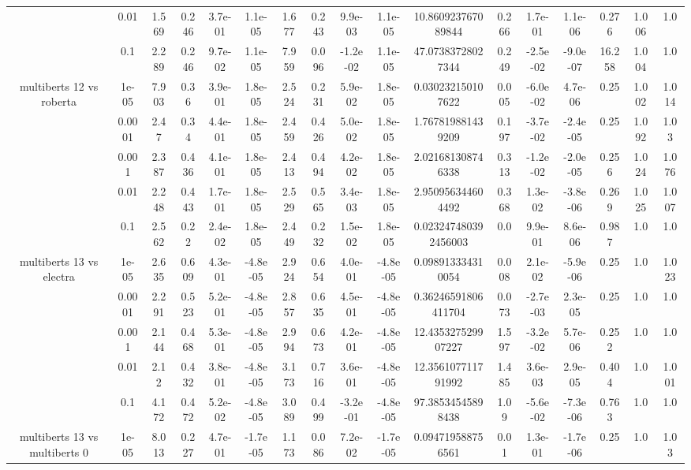 \begin{tabular}{|c|c|c|c|c|c|c|c|c|c|c|c|c|c|c|c|c|}
 & 0.01 & 1.569 & 0.246 & 3.7e-01 & 1.1e-05 & 1.677 & 0.243 & 9.9e-03 & 1.1e-05 & 10.860923767089844 & 0.266 & 1.7e-01 & 1.1e-06 & 0.276 & 1.006 & 1.0 \\
 & 0.1 & 2.289 & 0.246 & 9.7e-02 & 1.1e-05 & 7.959 & 0.096 & -1.2e-02 & 1.1e-05 & 47.07383728027344 & 0.249 & -2.5e-02 & -9.0e-07 & 16.258 & 1.004 & 1.0 \\
\hline
\multirow{5}{*}{multiberts 12 vs roberta } & 1e-05 & 7.903 & 0.36 & 3.9e-01 & 1.8e-05 & 2.524 & 0.231 & 5.9e-02 & 1.8e-05 & 0.030232150107622 & 0.005 & -6.0e-02 & 4.7e-06 & 0.25 & 1.002 & 1.014 \\
 & 0.0001 & 2.47 & 0.34 & 4.4e-01 & 1.8e-05 & 2.459 & 0.426 & 5.0e-02 & 1.8e-05 & 1.767819881439209 & 0.197 & -3.7e-02 & -2.4e-05 & 0.25 & 1.092 & 1.03 \\
 & 0.001 & 2.387 & 0.436 & 4.1e-01 & 1.8e-05 & 2.413 & 0.494 & 4.2e-02 & 1.8e-05 & 2.021681308746338 & 0.313 & -1.2e-02 & -2.0e-05 & 0.256 & 1.024 & 1.076 \\
 & 0.01 & 2.248 & 0.443 & 1.7e-01 & 1.8e-05 & 2.529 & 0.565 & 3.4e-03 & 1.8e-05 & 2.950956344604492 & 0.368 & 1.3e-02 & -3.8e-06 & 0.269 & 1.025 & 1.007 \\
 & 0.1 & 2.562 & 0.22 & 2.4e-02 & 1.8e-05 & 2.449 & 0.232 & 1.5e-02 & 1.8e-05 & 0.023247480392456003 & 0.0 & 9.9e-01 & 8.6e-06 & 0.987 & 1.0 & 1.0 \\
\hline
\multirow{5}{*}{multiberts 13 vs electra } & 1e-05 & 2.635 & 0.609 & 4.3e-01 & -4.8e-05 & 2.924 & 0.654 & 4.0e-01 & -4.8e-05 & 0.098913334310054 & 0.008 & 2.1e-02 & -5.9e-06 & 0.25 & 1.0 & 1.023 \\
 & 0.0001 & 2.291 & 0.523 & 5.2e-01 & -4.8e-05 & 2.857 & 0.635 & 4.5e-01 & -4.8e-05 & 0.36246591806411704 & 0.073 & -2.7e-03 & 2.3e-05 & 0.25 & 1.0 & 1.0 \\
 & 0.001 & 2.144 & 0.468 & 5.3e-01 & -4.8e-05 & 2.994 & 0.673 & 4.2e-01 & -4.8e-05 & 12.435327529907227 & 1.597 & -3.2e-02 & 5.7e-06 & 0.252 & 1.0 & 1.0 \\
 & 0.01 & 2.12 & 0.432 & 3.8e-01 & -4.8e-05 & 3.173 & 0.716 & 3.6e-01 & -4.8e-05 & 12.356107711791992 & 1.485 & 3.6e-03 & 2.9e-05 & 0.404 & 1.0 & 1.001 \\
 & 0.1 & 4.172 & 0.472 & 5.2e-02 & -4.8e-05 & 3.089 & 0.499 & -3.2e-01 & -4.8e-05 & 97.38534545898438 & 1.09 & -5.6e-02 & -7.3e-06 & 0.763 & 1.0 & 1.0 \\
\hline
\multirow{5}{*}{multiberts 13 vs multiberts 0} & 1e-05 & 8.013 & 0.227 & 4.7e-01 & -1.7e-05 & 1.173 & 0.086 & 7.2e-02 & -1.7e-05 & 0.094719588756561 & 0.01 & 1.3e-01 & -1.7e-06 & 0.25 & 1.0 & 1.03 \\

\end{tabular}
